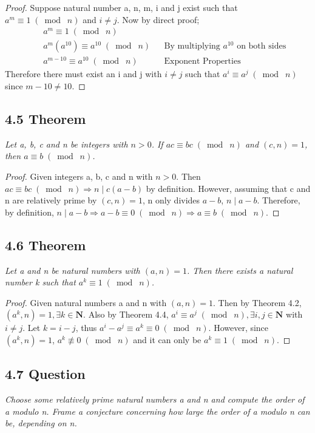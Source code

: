 \documentclass{article}
\begin{document}
\begin{proof}
Suppose natural number a, n, m, i and j exist such that $a^m \equiv 1 \;(\bmod\; n)$ and $i \neq j$. Now by direct proof;
\begin{align*}
    && a^m \equiv 1 \;(\bmod\; n)&&\\
    && a^m(a^{10}) \equiv a^{10} \;(\bmod\; n)&& \text{By multiplying $a^{10}$ on both sides}\\
    && a^{m-10} \equiv a^{10} \;(\bmod\; n)&& \text{Exponent Properties}
\end{align*}
Therefore there must exist an i and j with $i \neq j$ such that $a^i \equiv a^j \;(\bmod\; n)$ since $m-10 \neq 10$.
\end{proof}

\subsection*{4.5 Theorem} 
\quad \textit{Let a, b, c and n be integers with $n > 0$. If $ac \equiv bc \;(\bmod\; n)$ and $(c, n) = 1$, then $a \equiv b \;(\bmod\; n)$.}

\begin{proof}
Given integers a, b, c and n with $n > 0$. Then $ac \equiv bc \;(\bmod\; n) \Longrightarrow n \mid c(a-b)$ by definition. However, assuming that c and n are relatively prime by $(c, n) = 1$, n only divides $a - b$, $n \mid a - b$. Therefore, by definition, $n \mid a - b \Longrightarrow a - b \equiv 0 \;(\bmod\; n) \Longrightarrow a \equiv b \;(\bmod\; n)$.
\end{proof}

\subsection*{4.6 Theorem} 
\quad \textit{Let a and n be natural numbers with $(a, n) = 1$. Then there exists a natural number k such that $a^k \equiv 1 \;(\bmod\; n)$.}

\begin{proof}
Given natural numbers a and n with $(a, n) = 1$. Then by Theorem 4.2, $(a^k, n) = 1, \exists k \in \mathbf{N}$. Also by Theorem 4.4, $a^i \equiv a^j \;(\bmod\; n), \exists i, j \in \mathbf{N}$ with $i \neq j$. Let $k = i - j$, thus $a^i - a^j \equiv a^k \equiv 0 \;(\bmod\; n)$. However, since $(a^k, n) = 1$, $a^{k} \not\equiv 0 \;(\bmod\; n)$ and it can only be $a^{k} \equiv 1 \;(\bmod\; n)$.
\end{proof}

\subsection*{4.7 Question} 
\quad \textit{Choose some relatively prime natural numbers a and n and compute the order of a modulo n. Frame a conjecture concerning how large the order of a modulo n can be, depending on n.}
\end{document}
